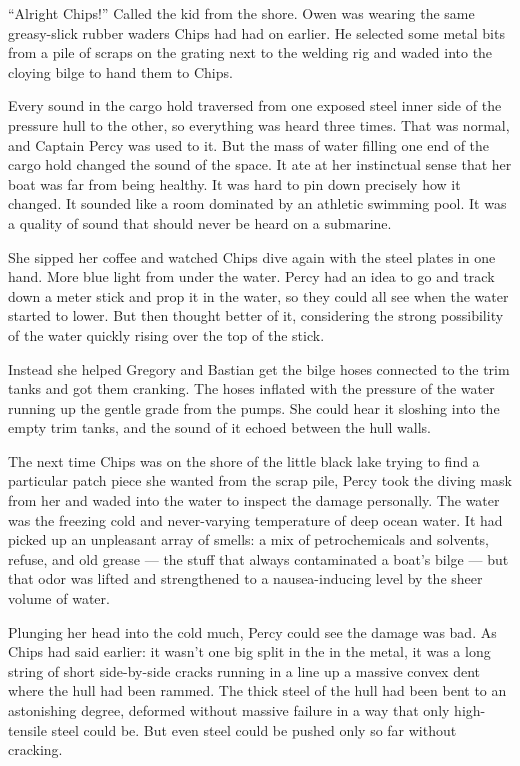 \documentclass[
]{scrbook}
\begin{document}
``Alright Chips!'' Called the kid from the shore. Owen was wearing the
same greasy-slick rubber waders Chips had had on earlier. He selected
some metal bits from a pile of scraps on the grating next to the welding
rig and waded into the cloying bilge to hand them to Chips.

Every sound in the cargo hold traversed from one exposed steel inner
side of the pressure hull to the other, so everything was heard three
times. That was normal, and Captain Percy was used to it. But the mass
of water filling one end of the cargo hold changed the sound of the
space. It ate at her instinctual sense that her boat was far from being
healthy. It was hard to pin down precisely how it changed. It sounded
like a room dominated by an athletic swimming pool. It was a quality of
sound that should never be heard on a submarine.

She sipped her coffee and watched Chips dive again with the steel plates
in one hand. More blue light from under the water. Percy had an idea to
go and track down a meter stick and prop it in the water, so they could
all see when the water started to lower. But then thought better of it,
considering the strong possibility of the water quickly rising over the
top of the stick.

Instead she helped Gregory and Bastian get the bilge hoses connected to
the trim tanks and got them cranking. The hoses inflated with the
pressure of the water running up the gentle grade from the pumps. She
could hear it sloshing into the empty trim tanks, and the sound of it
echoed between the hull walls.

The next time Chips was on the shore of the little black lake trying to
find a particular patch piece she wanted from the scrap pile, Percy took
the diving mask from her and waded into the water to inspect the damage
personally. The water was the freezing cold and never-varying
temperature of deep ocean water. It had picked up an unpleasant array of
smells: a mix of petrochemicals and solvents, refuse, and old grease ---
the stuff that always contaminated a boat's bilge --- but that odor was
lifted and strengthened to a nausea-inducing level by the sheer volume
of water.

Plunging her head into the cold much, Percy could see the damage was
bad. As Chips had said earlier: it wasn't one big split in the in the
metal, it was a long string of short side-by-side cracks running in a
line up a massive convex dent where the hull had been rammed. The thick
steel of the hull had been bent to an astonishing degree, deformed
without massive failure in a way that only high-tensile steel could be.
But even steel could be pushed only so far without cracking.
\end{document}
